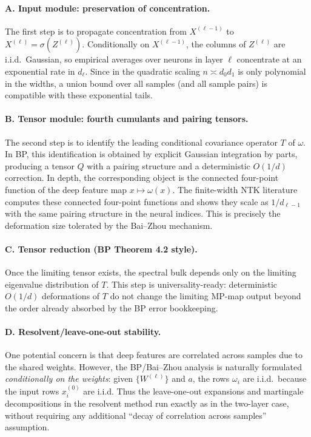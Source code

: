 \documentclass[11pt]{article}
\begin{document}
\paragraph{A. Input module: preservation of concentration.}
The first step is to propagate concentration from $X^{(\ell-1)}$ to $X^{(\ell)}=\sigma(Z^{(\ell)})$.
Conditionally on $X^{(\ell-1)}$, the columns of $Z^{(\ell)}$ are i.i.d.\ Gaussian, so empirical averages over neurons in layer $\ell$ concentrate at an exponential rate in $d_\ell$.
Since in the quadratic scaling $n\asymp d_0 d_1$ is only polynomial in the widths, a union bound over all samples (and all sample pairs) is compatible with these exponential tails.

\paragraph{B. Tensor module: fourth cumulants and pairing tensors.}
The second step is to identify the leading conditional covariance operator $T$ of $\omega$.
In BP, this identification is obtained by explicit Gaussian integration by parts, producing a tensor $Q$ with a pairing structure and a deterministic $O(1/d)$ correction.
In depth, the corresponding object is the connected four-point function of the deep feature map $x\mapsto \omega(x)$.
The finite-width NTK literature computes these connected four-point functions and shows they scale as $1/d_{\ell-1}$ with the same pairing structure in the neural indices.
This is precisely the deformation size tolerated by the Bai--Zhou mechanism.

\paragraph{C. Tensor reduction (BP Theorem 4.2 style).}
Once the limiting tensor exists, the spectral bulk depends only on the limiting eigenvalue distribution of $T$.
This step is universality-ready: deterministic $O(1/d)$ deformations of $T$ do not change the limiting MP-map output beyond the order already absorbed by the BP error bookkeeping.

\paragraph{D. Resolvent/leave-one-out stability.}
One potential concern is that deep features are correlated across samples due to the shared weights.
However, the BP/Bai--Zhou analysis is naturally formulated \emph{conditionally on the weights}:
given $\{W^{(\ell)}\}$ and $a$, the rows $\omega_i$ are i.i.d.\ because the input rows $x_i^{(0)}$ are i.i.d.
Thus the leave-one-out expansions and martingale decompositions in the resolvent method run exactly as in the two-layer case, without requiring any additional ``decay of correlation across samples'' assumption.
\end{document}
